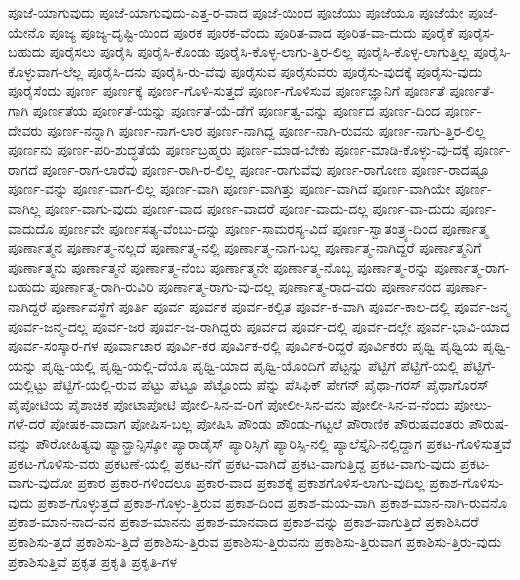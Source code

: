 {ಪೂಜೆ-ಯಾಗುವುದು
ಪೂಜೆ-ಯಾಗುವುದು-ಎತ್ತ-ರ-ವಾದ
ಪೂಜೆ-ಯಿಂದ
ಪೂಜೆಯು
ಪೂಜೆಯೂ
ಪೂಜೆಯೇ
ಪೂಜೆ-ಯೇನೊ
ಪೂಜ್ಯ
ಪೂಜ್ಯ-ದೃಷ್ಟಿ-ಯಿಂದ
ಪೂರಕ
ಪೂರಕ-ವೆಂದು
ಪೂರಿತ-ವಾದ
ಪೂರಿತ-ವಾ-ದುದು
ಪೂರೈಕೆ
ಪೂರೈಸ-ಬಹುದು
ಪೂರೈಸಲು
ಪೂರೈಸಿ
ಪೂರೈಸಿ-ಕೊಂಡು
ಪೂರೈಸಿ-ಕೊಳ್ಳ-ಲಾಗು-ತ್ತಿರ-ಲಿಲ್ಲ
ಪೂರೈಸಿ-ಕೊಳ್ಳ-ಲಾಗುತ್ತಿಲ್ಲ
ಪೂರೈಸಿ-ಕೊಳ್ಳುವಾಗ-ಲೆಲ್ಲ
ಪೂರೈಸಿ-ದನು
ಪೂರೈಸಿ-ರು-ವೆವು
ಪೂರೈಸುವ
ಪೂರೈಸುವರು
ಪೂರೈಸು-ವುದಕ್ಕೆ
ಪೂರೈಸು-ವುದು
ಪೂರೈಸೆಂದು
ಪೂರ್ಣ
ಪೂರ್ಣಕ್ಕೆ
ಪೂರ್ಣ-ಗೊಳಿ-ಸುತ್ತದೆ
ಪೂರ್ಣ-ಗೊಳಿಸುವ
ಪೂರ್ಣಜ್ಞಾನಿಗೆ
ಪೂರ್ಣತೆ
ಪೂರ್ಣತೆ-ಗಾಗಿ
ಪೂರ್ಣತೆಯ
ಪೂರ್ಣತೆ-ಯನ್ನು
ಪೂರ್ಣತೆ-ಯೆ-ಡೆಗೆ
ಪೂರ್ಣತ್ವ-ವನ್ನು
ಪೂರ್ಣದ
ಪೂರ್ಣ-ದಿಂದ
ಪೂರ್ಣ-ದೇವರು
ಪೂರ್ಣ-ನನ್ನಾಗಿ
ಪೂರ್ಣ-ನಾಗ-ಲಾರ
ಪೂರ್ಣ-ನಾಗಿದ್ದ
ಪೂರ್ಣ-ನಾಗಿ-ರುವನು
ಪೂರ್ಣ-ನಾಗು-ತ್ತಿರ-ಲಿಲ್ಲ
ಪೂರ್ಣನು
ಪೂರ್ಣ-ಪರಿ-ಶುದ್ಧತೆಯೆ
ಪೂರ್ಣಬ್ರಹ್ಮರು
ಪೂರ್ಣ-ಮಾಡ-ಬೇಕು
ಪೂರ್ಣ-ಮಾಡಿ-ಕೊಳ್ಳು-ವು-ದಕ್ಕೆ
ಪೂರ್ಣ-ರಾಗದೆ
ಪೂರ್ಣ-ರಾಗ-ಲಾರೆವು
ಪೂರ್ಣ-ರಾಗಿ-ರ-ಲಿಲ್ಲ
ಪೂರ್ಣ-ರಾಗುವೆವು
ಪೂರ್ಣ-ರಾಗೋಣ
ಪೂರ್ಣ-ರಾದಷ್ಟೂ
ಪೂರ್ಣ-ವನ್ನು
ಪೂರ್ಣ-ವಾಗ-ಲಿಲ್ಲ
ಪೂರ್ಣ-ವಾಗಿ
ಪೂರ್ಣ-ವಾಗಿತ್ತು
ಪೂರ್ಣ-ವಾಗಿದೆ
ಪೂರ್ಣ-ವಾಗಿಯೇ
ಪೂರ್ಣ-ವಾಗಿಲ್ಲ
ಪೂರ್ಣ-ವಾಗು-ವುದು
ಪೂರ್ಣ-ವಾದ
ಪೂರ್ಣ-ವಾದರೆ
ಪೂರ್ಣ-ವಾದು-ದಲ್ಲ
ಪೂರ್ಣ-ವಾ-ದುದು
ಪೂರ್ಣ-ವಾದುದೊ
ಪೂರ್ಣವೇ
ಪೂರ್ಣಸತ್ಯ-ವೆಂಬು-ದನ್ನು
ಪೂರ್ಣ-ಸಾಮರಸ್ಯ-ವಿದೆ
ಪೂರ್ಣ-ಸ್ವಾತಂತ್ರ್ಯ-ದಿಂದ
ಪೂರ್ಣಾತ್ಮ
ಪೂರ್ಣಾತ್ಮನ
ಪೂರ್ಣಾತ್ಮ-ನಲ್ಲದೆ
ಪೂರ್ಣಾತ್ಮ-ನಲ್ಲಿ
ಪೂರ್ಣಾತ್ಮ-ನಾಗ-ಬಲ್ಲ
ಪೂರ್ಣಾತ್ಮ-ನಾಗಿದ್ದರೆ
ಪೂರ್ಣಾತ್ಮನಿಗೆ
ಪೂರ್ಣಾತ್ಮನು
ಪೂರ್ಣಾತ್ಮನೆ
ಪೂರ್ಣಾತ್ಮ-ನೆಂಬ
ಪೂರ್ಣಾತ್ಮನೇ
ಪೂರ್ಣಾತ್ಮ-ನೊಬ್ಬ
ಪೂರ್ಣಾತ್ಮ-ರನ್ನು
ಪೂರ್ಣಾತ್ಮ-ರಾಗ-ಬಹುದು
ಪೂರ್ಣಾತ್ಮ-ರಾಗಿ-ರುವಿರಿ
ಪೂರ್ಣಾತ್ಮ-ರಾಗು-ವು-ದಲ್ಲ
ಪೂರ್ಣಾತ್ಮ-ರಾದ-ವರು
ಪೂರ್ಣಾನಂದ
ಪೂರ್ಣಾ-ನಾಗಿದ್ದರೆ
ಪೂರ್ಣಾವಸ್ಥೆಗೆ
ಪೂರ್ತಿ
ಪೂರ್ವ
ಪೂರ್ವಕ
ಪೂರ್ವ-ಕಲ್ಪಿತ
ಪೂರ್ವ-ಕ-ವಾಗಿ
ಪೂರ್ವ-ಕಾಲ-ದಲ್ಲಿ
ಪೂರ್ವ-ಜನ್ಮ
ಪೂರ್ವ-ಜನ್ಮ-ದಲ್ಲ
ಪೂರ್ವ-ಜರ
ಪೂರ್ವ-ಜ-ರಾಗಿದ್ದರು
ಪೂರ್ವದ
ಪೂರ್ವ-ದಲ್ಲಿ
ಪೂರ್ವ-ದಲ್ಲೇ
ಪೂರ್ವ-ಭಾವಿ-ಯಾದ
ಪೂರ್ವ-ಸಂಸ್ಕಾರ-ಗಳ
ಪೂರ್ವಾಚಾರ
ಪೂರ್ವಿ-ಕರ
ಪೂರ್ವಿಕ-ರಲ್ಲಿ
ಪೂರ್ವಿಕ-ರಿದ್ದರೆ
ಪೂರ್ವಿಕರು
ಪೃಥ್ವಿ
ಪೃಥ್ವಿಯ
ಪೃಥ್ವಿ-ಯನ್ನು
ಪೃಥ್ವಿ-ಯಲ್ಲಿ
ಪೃಥ್ವಿ-ಯಲ್ಲಿ-ದೆಯೊ
ಪೃಥ್ವಿ-ಯಾದ
ಪೃಥ್ವಿ-ಯೊಂದಿಗೆ
ಪೆಟ್ಟನ್ನು
ಪೆಟ್ಟಿಗೆ
ಪೆಟ್ಟಿಗೆ-ಯಲ್ಲಿ
ಪೆಟ್ಟಿಗೆ-ಯಲ್ಲಿಟ್ಟು
ಪೆಟ್ಟಿಗೆ-ಯಲ್ಲಿ-ರುವ
ಪೆಟ್ಟು
ಪೆಟ್ಟೂ
ಪೆಟ್ಟೊಂದು
ಪೆನ್ನು
ಪೆಸಿಫಿಕ್
ಪೇಗನ್
ಪೈಥಾ-ಗರಸ್
ಪೈಥಾಗೊರಸ್
ಪೈಪೋಟಿಯ
ಪೈಶಾಚಿಕ
ಪೋಟಾಪೋಟಿ
ಪೋಲಿ-ಸಿನ-ವ-ರಿಗೆ
ಪೋಲೀ-ಸಿನ-ವನು
ಪೋಲೀ-ಸಿನ-ವ-ನೆಂದು
ಪೋಲು-ಗಳೆ-ದರೆ
ಪೋಷಕ-ವಾದಾಗ
ಪೋಷಿಸ-ಬಲ್ಲ
ಪೋಷಿಸಿ
ಪೌಂಡು
ಪೌಂಡು-ಗಟ್ಟಲೆ
ಪೌರಾಣಿಕ
ಪೌರುಷವಂತರು
ಪೌರುಷ-ವನ್ನು
ಪೌರೋಹಿತ್ಯವು
ಪ್ಯಾನ್ಫ್ರಾನ್ಸಿಸ್ಕೋ
ಪ್ಯಾರಾಡೈಸ್
ಪ್ಯಾರಿಸ್ಸಿಗೆ
ಪ್ಯಾರಿಸ್ಸಿ-ನಲ್ಲಿ
ಪ್ಯಾಲೆಸ್ತೈನಿ-ನಲ್ಲಿದ್ದಾಗ
ಪ್ರಕಟ-ಗೊಳಿಸುತ್ತವೆ
ಪ್ರಕಟ-ಗೊಳಿಸು-ವರು
ಪ್ರಕಟಣೆ-ಯಲ್ಲಿ
ಪ್ರಕಟ-ನೆಗೆ
ಪ್ರಕಟ-ವಾಗಿದೆ
ಪ್ರಕಟ-ವಾಗುತ್ತಿದ್ದ
ಪ್ರಕಟ-ವಾಗು-ವುದು
ಪ್ರಕಟ-ವಾಗು-ವುದೋ
ಪ್ರಕಾರ
ಪ್ರಕಾರ-ಗಳಿಂದಲೂ
ಪ್ರಕಾರ-ವಾದ
ಪ್ರಕಾಶಕ್ಕೆ
ಪ್ರಕಾಶಗೊಳಿಸ-ಲಾಗು-ವುದಿಲ್ಲ
ಪ್ರಕಾಶ-ಗೊಳಿಸು-ವುದು
ಪ್ರಕಾಶ-ಗೊಳ್ಳುತ್ತದೆ
ಪ್ರಕಾಶ-ಗೊಳ್ಳು-ತ್ತಿರುವ
ಪ್ರಕಾಶ-ದಿಂದ
ಪ್ರಕಾಶ-ಮಯ-ವಾಗಿ
ಪ್ರಕಾಶ-ಮಾನ-ನಾಗಿ-ರುವನೊ
ಪ್ರಕಾಶ-ಮಾನ-ನಾದ-ವನ
ಪ್ರಕಾಶ-ಮಾನನು
ಪ್ರಕಾಶ-ಮಾನವಾದ
ಪ್ರಕಾಶ-ವನ್ನು
ಪ್ರಕಾಶ-ವಾಗುತ್ತಿದೆ
ಪ್ರಕಾಶಿಸಿದರೆ
ಪ್ರಕಾಶಿಸು-ತ್ತದೆ
ಪ್ರಕಾಶಿಸು-ತ್ತಿದೆ
ಪ್ರಕಾಶಿಸು-ತ್ತಿರುವ
ಪ್ರಕಾಶಿಸು-ತ್ತಿರುವನು
ಪ್ರಕಾಶಿಸು-ತ್ತಿರುವಾಗ
ಪ್ರಕಾಶಿಸು-ತ್ತಿರು-ವುದು
ಪ್ರಕಾಶಿಸುತ್ತಿವೆ
ಪ್ರಕೃತ
ಪ್ರಕೃತಿ
ಪ್ರಕೃತಿ-ಗಳ
}
